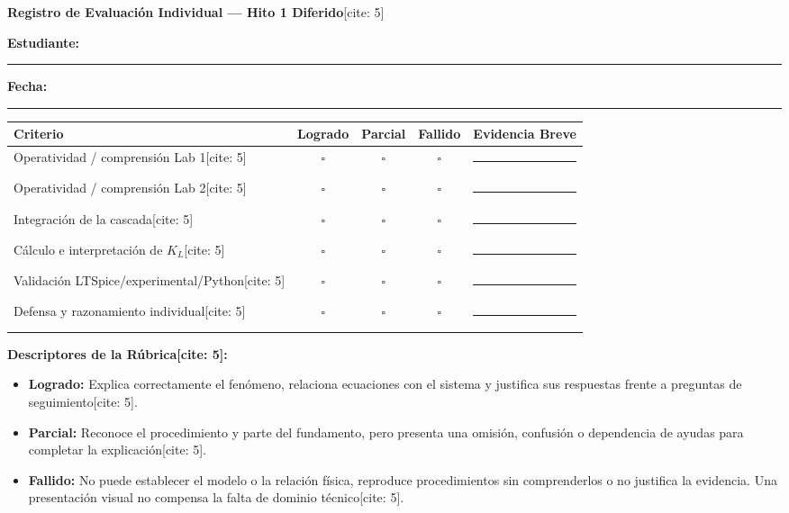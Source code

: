 \documentclass[11pt, a4paper]{article}
\begin{document}
\begin{center}
    \Large\textbf{\textcolor{ucbblue}{Registro de Evaluación Individual — Hito 1 Diferido}}[cite: 5]
\end{center}

\textbf{Estudiante:} \rule{7cm}{0.4pt} \hfill \textbf{Fecha:} \rule{4cm}{0.4pt}

\vspace{0.4cm}
\begin{tcolorbox}[colback=white, colframe=ucbblue, title=\textbf{Matriz de Evaluación[cite: 5]}]
\renewcommand{\arraystretch}{1.5}
\begin{tabularx}{\textwidth}{@{} l c c c X @{}}
\toprule
\rowcolor[HTML]{EFEFEF}
\textbf{Criterio} & \textbf{Logrado} & \textbf{Parcial} & \textbf{Fallido} & \textbf{Evidencia Breve} \\ \midrule
Operatividad / comprensión Lab 1[cite: 5] & $\square$ & $\square$ & $\square$ & \rule{\linewidth}{0.4pt} \\
Operatividad / comprensión Lab 2[cite: 5] & $\square$ & $\square$ & $\square$ & \rule{\linewidth}{0.4pt} \\
Integración de la cascada[cite: 5] & $\square$ & $\square$ & $\square$ & \rule{\linewidth}{0.4pt} \\
Cálculo e interpretación de $K_L$[cite: 5] & $\square$ & $\square$ & $\square$ & \rule{\linewidth}{0.4pt} \\
Validación LTSpice/experimental/Python[cite: 5] & $\square$ & $\square$ & $\square$ & \rule{\linewidth}{0.4pt} \\
Defensa y razonamiento individual[cite: 5] & $\square$ & $\square$ & $\square$ & \rule{\linewidth}{0.4pt} \\
\bottomrule
\end{tabularx}
\end{tcolorbox}

\vspace{0.2cm}
\textbf{Descriptores de la Rúbrica[cite: 5]:}
\begin{itemize}
    \item \textbf{Logrado:} Explica correctamente el fenómeno, relaciona ecuaciones con el sistema y justifica sus respuestas frente a preguntas de seguimiento[cite: 5].
    \item \textbf{Parcial:} Reconoce el procedimiento y parte del fundamento, pero presenta una omisión, confusión o dependencia de ayudas para completar la explicación[cite: 5].
    \item \textbf{Fallido:} No puede establecer el modelo o la relación física, reproduce procedimientos sin comprenderlos o no justifica la evidencia. Una presentación visual no compensa la falta de dominio técnico[cite: 5].
\end{itemize}
\end{document}

